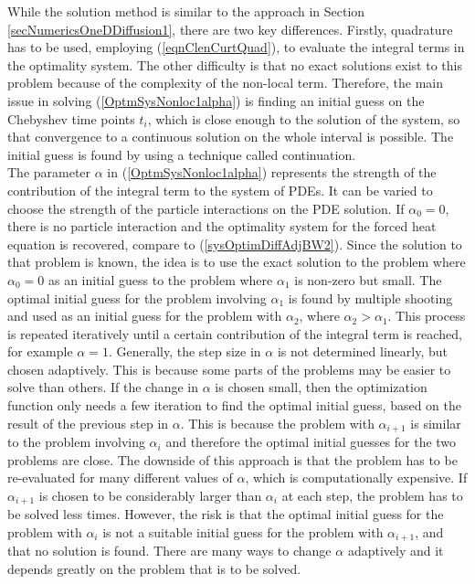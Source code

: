  While the solution method is similar to the approach in Section \ref{secNumericsOneDDiffusion1}, there are two key differences. Firstly, quadrature has to be used, employing (\ref{eqnClenCurtQuad}), to evaluate the integral terms in the optimality system. The other difficulty is that no exact solutions exist to this problem because of the complexity of the non-local term. Therefore, the main issue in solving (\ref{OptmSysNonloc1alpha}) is finding an initial guess on the Chebyshev time points $t_i$, which is close enough to the solution of the system, so that convergence to a continuous solution on the whole interval is possible. The initial guess is found by using a technique called continuation.
 \\
The parameter $\alpha$ in (\ref{OptmSysNonloc1alpha}) represents the strength of the contribution of the integral term to the system of PDEs. 
It can be varied to choose the strength of the particle interactions on the PDE solution. If $\alpha_0=0$, there is no particle interaction and the optimality system for the forced heat equation is recovered, compare to (\ref{sysOptimDiffAdjBW2}).
 Since the solution to that problem is known, the idea is to use the exact solution to the problem where $\alpha_0=0$ as an initial guess to the problem where $\alpha_1$ is non-zero but small.
The optimal initial guess for the problem involving $\alpha_1$ is found by multiple shooting and used as an initial guess for the problem with $\alpha_2$, where $\alpha_2>\alpha_1$. This process is repeated iteratively until a certain contribution of the integral term is reached, for example $\alpha=1$. 
\newline
Generally, the step size in $\alpha$ is not determined linearly, but chosen adaptively. This is because some parts of the problems may be easier to solve than others. If the change in $\alpha$ is chosen small, then the optimization function only needs a few iteration to find the optimal initial guess, based on the result of the previous step in $\alpha$. This is because the problem with $\alpha_{i+1}$ is similar to the problem involving $\alpha_i$ and therefore the optimal initial guesses for the two problems are close. The downside of this approach is that the problem has to be re-evaluated for many different values of $\alpha$, which is computationally expensive. If $\alpha_{i+1}$ is chosen to be considerably larger than $\alpha_i$ at each step, the problem has to be solved less times. However, the risk is that the optimal initial guess for the problem with $\alpha_i$ is not a suitable initial guess for the problem with $\alpha_{i+1}$, and that no solution is found.
There are many ways to change $\alpha$ adaptively and it depends greatly on the problem that is to be solved. 

